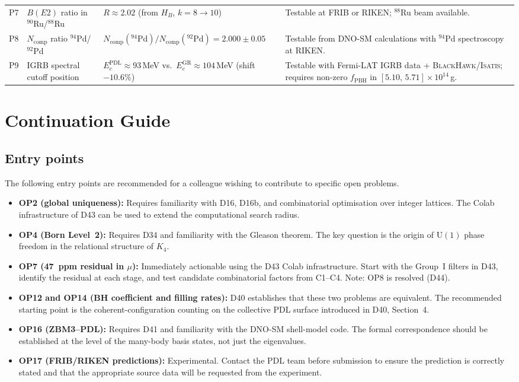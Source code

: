 \documentclass[11pt,a4paper]{article}
\theoremstyle{plain}
\theoremstyle{definition}
\theoremstyle{remark}
\begin{document}
\begin{longtable}{L{0.5cm}L{3.2cm}L{5.2cm}L{4.2cm}}
P7 & $B(E2)$ ratio in $^{90}$Ru/$^{88}$Ru & $R\approx 2.02$ (from $H_B$, $k=8\to10$) & Testable at FRIB or RIKEN; $^{88}$Ru beam available.\\[0.4em]
P8 & $N_{\mathrm{comp}}$ ratio $^{94}$Pd/$^{92}$Pd & $N_{\mathrm{comp}}(^{94}\mathrm{Pd})/N_{\mathrm{comp}}(^{92}\mathrm{Pd})=2.000\pm0.05$ & Testable from DNO-SM calculations with $^{94}$Pd spectroscopy at RIKEN.\\[0.4em]
P9 & IGRB spectral cutoff position & $E_c^{\mathrm{PDL}} \approx 93$\,MeV vs.\ $E_c^{\mathrm{GR}} \approx 104$\,MeV (shift $-10.6\%$) & Testable with Fermi-LAT IGRB data + \textsc{BlackHawk}/\textsc{Isatis}; requires non-zero $f_{\mathrm{PBH}}$ in $[5.10,\,5.71]\times10^{14}$\,g.\\[0.4em]
\end{longtable}

\section{Continuation Guide}
\label{sec:continuation}

\subsection{Entry points}
\label{subsec:entrypoints}
The following entry points are recommended for a colleague wishing to contribute to specific open problems.

\begin{itemize}
\item \textbf{OP2 (global uniqueness):} Requires familiarity with D16, D16b, and combinatorial optimisation over integer lattices. The Colab infrastructure of D43 can be used to extend the computational search radius.
\item \textbf{OP4 (Born Level~2):} Requires D34 and familiarity with the Gleason theorem. The key question is the origin of $\mathrm{U}(1)$ phase freedom in the relational structure of $K_4$.
\item \textbf{OP7 (47~ppm residual in $\mu$):} Immediately actionable using the D43 Colab infrastructure. Start with the Group~I filters in D43, identify the residual at each stage, and test candidate combinatorial factors from C1--C4. Note: OP8 is resolved (D44).
\item \textbf{OP12 and OP14 (BH coefficient and filling rates):} D40 establishes that these two problems are equivalent. The recommended starting point is the coherent-configuration counting on the collective PDL surface introduced in D40, Section~4.
\item \textbf{OP16 (ZBM3--PDL):} Requires D41 and familiarity with the DNO-SM shell-model code. The formal correspondence should be established at the level of the many-body basis states, not just the eigenvalues.
\item \textbf{OP17 (FRIB/RIKEN predictions):} Experimental. Contact the PDL team before submission to ensure the prediction is correctly stated and that the appropriate source data will be requested from the experiment.
\end{itemize}
\end{document}
